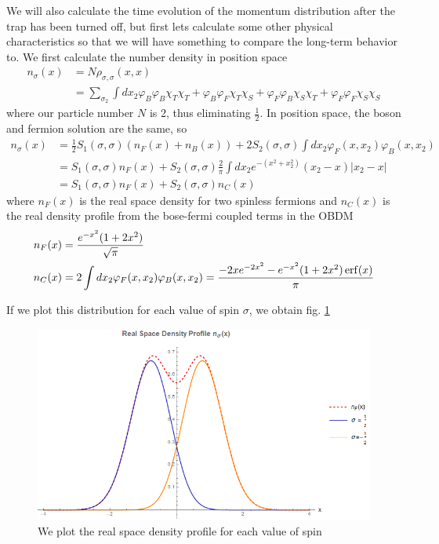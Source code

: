 \documentclass[onecolumn,english,aps,pra]{revtex4}
\begin{document}
We will also calculate the time evolution of the momentum distribution after the trap has been turned off, but first lets calculate some other physical characteristics so that we will have something to compare the long-term behavior to. We first calculate the number density in position space
\begin{align}
n_{\sigma}(x) & = N \rho_{\sigma, \sigma}(x,x)\\
& = \sum_{\sigma_2} \int dx_2 
\varphi_B\varphi_B\chi_T\chi_T
+ \varphi_B\varphi_F\chi_T\chi_S
+ \varphi_F\varphi_B\chi_S\chi_T
+ \varphi_F\varphi_F\chi_S\chi_S \nonumber
\end{align}
where our particle number $N$ is 2, thus eliminating $\frac{1}{2}$. In position space, the boson and fermion solution are the same, so
\begin{align}
n_{\sigma}(x) & = \frac{1}{2}S_1(\sigma, \sigma)(n_F(x) + n_B(x)) + 2S_2(\sigma,\sigma) \int dx_2 \varphi_F(x,x_2)\varphi_B(x,x_2)\nonumber\\
&= S_1(\sigma, \sigma)n_F(x) + S_2(\sigma,\sigma) \frac{2}{\pi} \int dx_2 e^{-(x^2 + x_2^2)} (x_2 -x ) |x_2 - x| \nonumber\\
&= S_1(\sigma, \sigma)n_F(x) + S_2(\sigma,\sigma) n_C(x)
\end{align}
where $n_F(x)$ is the real space density for two spinless fermions and $n_C(x)$ is the real density profile from the bose-fermi coupled 	terms in the OBDM
\begin{align}
n_F(x) &= \frac{e^{-x^2}(1+2x^2)}{\sqrt{\pi}} \label{nfRSDP}\\
n_C(x) &= 2 \int dx_2 \varphi_F(x,x_2)\varphi_B(x,x_2)= \frac{-2x e^{-2x^2} - e^{-x^2} (1+2x^2) \erf(x)}{\pi}
\label{ncRSDP}
\end{align}

If we plot this distribution for each value of spin $\sigma$, we obtain fig. \ref{fig:PositionDist}

\begin{figure}
\includegraphics[scale=0.6]{"../Plots/RSpaceDProfileMixedSpinor"}
\caption{We plot the real space density profile for each value of spin}
\label{fig:PositionDist}
\end{figure}
\end{document}
